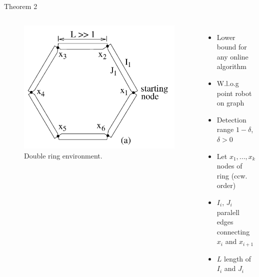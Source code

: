 \documentclass{beamer}
\begin{document}
\begin{frame}{Theorem 2}
    \begin{columns}
        \begin{figure}
            \includegraphics[width=\linewidth]{Images/fig13a.png}
            \caption{Double ring environment.}
        \end{figure}
        \begin{itemize}
            \item Lower bound for any online algorithm
            \item W.l.o.g point robot on graph
            \item Detection range $1 - \delta$, $\delta > 0$
            \item Let $x_1, ..., x_k$ nodes of ring (ccw. order)
            \item $I_i$, $J_i$ paralell edges connecting $x_i$ and $x_{i+1}$
            \item $L$ length of $I_i$ and $J_i$
        \end{itemize}
    \end{columns}
\end{frame}
\end{document}
